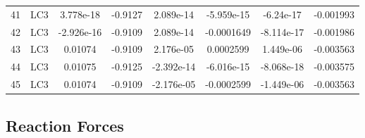 \documentclass{article}%
\begin{document}
\begin{longtable}{| c c | c c c c c c |}
41&LC3&3.778e{-}18&{-}0.9127&2.089e{-}14&{-}5.959e{-}15&{-}6.24e{-}17&{-}0.001993\\%
42&LC3&{-}2.926e{-}16&{-}0.9109&2.089e{-}14&{-}0.0001649&{-}8.114e{-}17&{-}0.001986\\%
43&LC3&0.01074&{-}0.9109&2.176e{-}05&0.0002599&1.449e{-}06&{-}0.003563\\%
44&LC3&0.01075&{-}0.9125&{-}2.392e{-}14&{-}6.016e{-}15&{-}8.068e{-}18&{-}0.003575\\%
45&LC3&0.01074&{-}0.9109&{-}2.176e{-}05&{-}0.0002599&{-}1.449e{-}06&{-}0.003563\\%
\end{longtable}

%
\subsection{Reaction Forces}%
\label{subsec:ReactionForces}%
\end{document}

